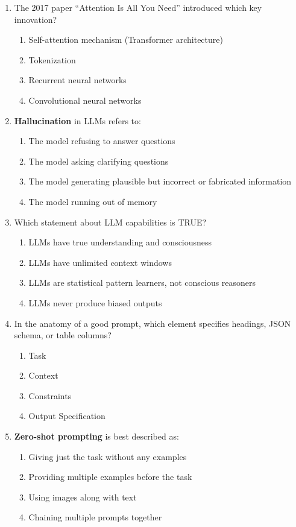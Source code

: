 \documentclass[11pt]{article}
\begin{document}
\begin{enumerate}
\item The 2017 paper ``Attention Is All You Need'' introduced which key innovation?
\begin{enumerate}[label=\Alph*)]
    \item Self-attention mechanism (Transformer architecture)
    \item Tokenization
    \item Recurrent neural networks
    \item Convolutional neural networks
\end{enumerate}

\item \textbf{Hallucination} in LLMs refers to:
\begin{enumerate}[label=\Alph*)]
    \item The model refusing to answer questions
    \item The model asking clarifying questions
    \item The model generating plausible but incorrect or fabricated information
    \item The model running out of memory
\end{enumerate}

\item Which statement about LLM capabilities is TRUE?
\begin{enumerate}[label=\Alph*)]
    \item LLMs have true understanding and consciousness
    \item LLMs have unlimited context windows
    \item LLMs are statistical pattern learners, not conscious reasoners
    \item LLMs never produce biased outputs
\end{enumerate}

\item In the anatomy of a good prompt, which element specifies headings, JSON schema, or table columns?
\begin{enumerate}[label=\Alph*)]
    \item Task
    \item Context
    \item Constraints
    \item Output Specification
\end{enumerate}

\item \textbf{Zero-shot prompting} is best described as:
\begin{enumerate}[label=\Alph*)]
    \item Giving just the task without any examples
    \item Providing multiple examples before the task
    \item Using images along with text
    \item Chaining multiple prompts together
\end{enumerate}


\end{enumerate}
\end{document}
